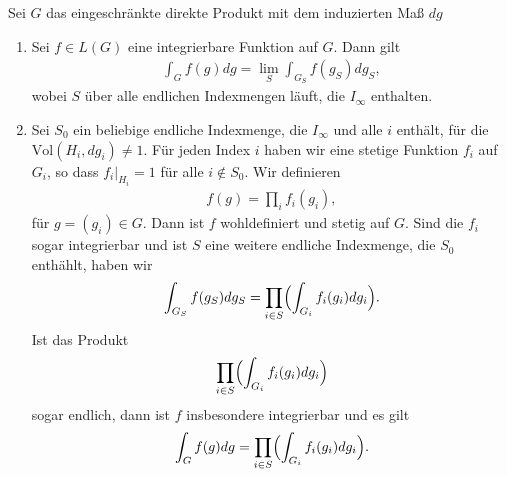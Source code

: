 		\begin{proposition}\label{prop:integrieren}
			Sei $G$ das eingeschränkte direkte Produkt mit dem induzierten Maß $dg$
			\begin{enumerate}[label=(\roman*)]
				\item Sei $f \in L(G)$ eine integrierbare Funktion auf $G$. Dann gilt
					\begin{align*}
						\int_G f(g)dg = \lim_S \int_{G_S} f(g_S) dg_S,
					\end{align*}
					wobei $S$ über alle endlichen Indexmengen läuft, die $I_\infty$ enthalten.
				\item Sei $S_0$ ein beliebige endliche Indexmenge, die $I_\infty$ und alle $i$ enthält, für die $\text{Vol}(H_i, dg_i) \not= 1$. 
					Für jeden Index $i$ haben wir eine stetige Funktion $f_i$ auf $G_i$, so dass $f_i |_{H_i} = 1$ für alle $i \notin S_0$. 
					Wir definieren
					\begin{align*}
						f(g) = \prod_{i}f_{i}(g_i),
					\end{align*}
					für $g=(g_i) \in G$. 
					Dann ist $f$ wohldefiniert und stetig auf $G$. 
					Sind die $f_i$ sogar integrierbar und ist $S$ eine weitere endliche Indexmenge, die $S_0$ enthählt, haben wir
					\begin{align}\label{eq:satz:integration}
						\int_{G_S} f(g_S) dg_S = \prod_{i \in S}\Bigl(\int_{G_i} f_i (g_i)dg_i\Bigr).
					\end{align}
					Ist das Produkt
					\begin{align*}
						\prod_{i \in S}\Bigl(\int_{G_i} f_i (g_i)dg_i\Bigr)
					\end{align*}
					sogar endlich, dann ist $f$ insbesondere integrierbar und es gilt
					\begin{align*}
						\int_{G} f(g) dg = \prod_{i \in S}\Bigl(\int_{G_i} f_i (g_i)dg_i\Bigr).
					\end{align*}	
			\end{enumerate}
		\end{proposition}
		
